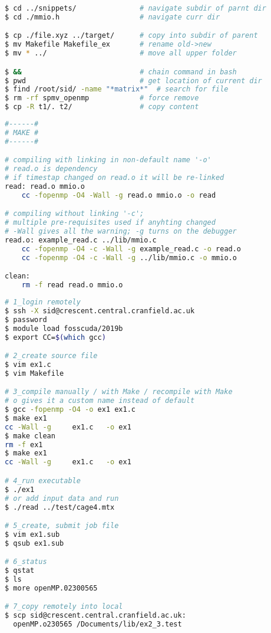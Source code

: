 \documentclass[8pt]{extarticle}
\begin{document}
\begin{small}
\begin{multicols}{2}
\begin{lstlisting}[language=bash]
$ cd ../snippets/				# navigate subdir of parnt dir
$ cd ./mmio.h					# navigate curr dir

$ cp ./file.xyz ../target/		# copy into subdir of parent
$ mv Makefile Makefile_ex		# rename old->new
$ mv * ../						# move all upper folder

$ &&							# chain command in bash
$ pwd							# get location of current dir
$ find /root/sid/ -name "*matrix*"	# search for file
$ rm -rf spmv_openmp			# force remove
$ cp -R t1/. t2/				# copy content
\end{lstlisting}

\begin{lstlisting}[language=bash]
#------#
# MAKE #
#------#

# compiling with linking in non-default name '-o'
# read.o is dependency
# if timestap changed on read.o it will be re-linked
read: read.o mmio.o
	cc -fopenmp -O4 -Wall -g read.o mmio.o -o read

# compiling without linking '-c'; 
# multiple pre-requisites used if anyhting changed
# -Wall gives all the warning; -g turns on the debugger
read.o: example_read.c ../lib/mmio.c
	cc -fopenmp -O4 -c -Wall -g example_read.c -o read.o
	cc -fopenmp -O4 -c -Wall -g ../lib/mmio.c -o mmio.o

clean:
	rm -f read read.o mmio.o

\end{lstlisting}


\begin{lstlisting}[language=bash]
# 1_login remotely
$ ssh -X sid@crescent.central.cranfield.ac.uk
$ password
$ module load fosscuda/2019b
$ export CC=$(which gcc)

# 2_create source file
$ vim ex1.c
$ vim Makefile

# 3_compile manually / with Make / recompile with Make
# o gives it a custom name instead of default
$ gcc -fopenmp -O4 -o ex1 ex1.c
$ make ex1
cc -Wall -g		ex1.c	-o ex1
$ make clean
rm -f ex1
$ make ex1
cc -Wall -g		ex1.c	-o ex1

# 4_run executable
$ ./ex1
# or add input data and run
$ ./read ../test/cage4.mtx

# 5_create, submit job file
$ vim ex1.sub
$ qsub ex1.sub

# 6_status
$ qstat
$ ls
$ more openMP.02300565

# 7_copy remotely into local
$ scp sid@crescent.central.cranfield.ac.uk:
  openMP.o230565 /Documents/lib/ex2_3.test
\end{lstlisting}



\end{multicols}
\end{small}
\end{document}
